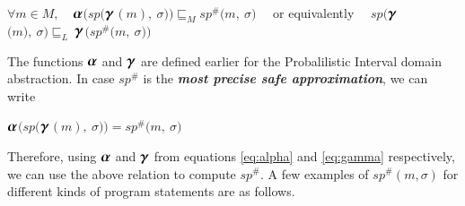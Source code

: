 \documentclass[final,3p, review, times]{util/elsarticle}
\newcommand{\ALPHA}{\large\boldsymbol{\alpha}\normalsize}
\newcommand{\GAMMA}{\large\boldsymbol{\gamma}\normalsize}
\begin{document}
\centerline{
$\forall m\in M,\quad$$\ALPHA$$\Big(sp\big($$\GAMMA$$(m),\ \sigma\big)\Big)\sqsubseteq_M sp^\#\big(m,\ \sigma\big)\quad$ or equivalently $\quad sp\Big($$\GAMMA$$\big(m\big),\ \sigma\Big)\sqsubseteq_L\ $$\GAMMA$$\Big(sp^\#\big(m,\ \sigma\big)\Big)$
}

The functions $\ALPHA$ and $\GAMMA$ are defined earlier for the Probalilistic Interval domain abstraction. In case $sp^\#$ is the \textbf{\textit{most precise safe approximation}}, we can write

\centerline{
$\ALPHA$$\Big(sp\big($$\GAMMA$$(m),\ \sigma\big)\Big)=sp^\#\big(m,\ \sigma\big)$
}
Therefore, using $\ALPHA$ and $\GAMMA$ from equations \ref{eq:alpha} and \ref{eq:gamma} respectively, we can use the above relation to compute $sp^\#$. A few examples of $sp^\#(m,\sigma)$ for different kinds of program statements are as follows.
\end{document}
